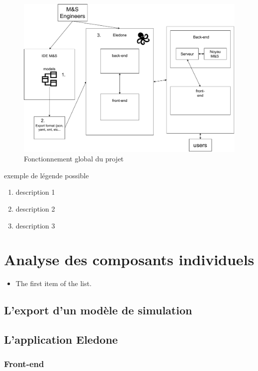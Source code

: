\documentclass{rapport_stage}
\begin{document}
\begin{figure}[ht]
  \centering
  \includegraphics[width=15cm]{figures/architecture_global.pdf}
  \caption{Fonctionnement global du projet}
  \label{fig:fonctionnement-lobal-projet}
\end{figure}

exemple de légende possible
\begin{enumerate}
  \item description 1
  \item description 2
  \item description 3
\end{enumerate}

\chapter{Analyse des composants individuels}

\begin{itemize}[label=$\bullet$]
  \item The first item of the list.
\end{itemize}

\section{L'export d'un modèle de simulation}

\section{L'application Eledone}


\subsection*{Front-end}
\end{document}
